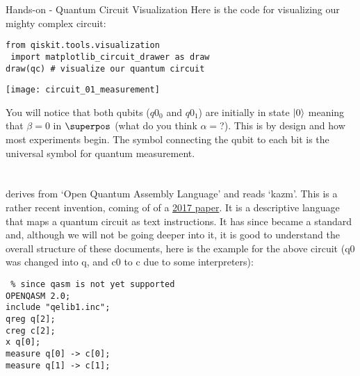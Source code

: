 \documentclass[aspectratio=43]{beamer}
\begin{document}
\begin{frame}[fragile]{Hands-on - Quantum Circuit Visualization}
Here is the code for visualizing our mighty complex circuit:
\begin{cardTiny}
\begin{verbatim}
from qiskit.tools.visualization 
 import matplotlib_circuit_drawer as draw
draw(qc) # visualize our quantum circuit
\end{verbatim}
\end{cardTiny}
\begin{center}
    \texttt{[image: circuit\_01\_measurement]}
\end{center}
\small{
    You will notice that both qubits ($q0_0$ and $q0_1$) are initially in state $\ket{0}$ meaning that $\beta=0$ in $\superpos$ (what do you think $\alpha=$?). This is by design and how most experiments begin. The symbol connecting the qubit to each bit is the universal symbol for quantum measurement.
}
\end{frame}

\section{\qasm}
\begin{frame}[fragile]{\qasm}
    \begin{cardTiny}
    \small{
    \qasm derives from `Open Quantum Assembly Language' and reads `kazm'. This is a rather recent invention, coming of of a \href{https://arxiv.org/abs/1707.03429}{2017 paper}. It is a descriptive language that maps a quantum circuit as text instructions. It has since became a standard and, although we will not be going deeper into it, it is good to understand the overall structure of these documents, here is the example for the above circuit (q0 was changed into q, and c0 to c due to some \qasm interpreters):
    }
    \end{cardTiny}
    \begin{cardTiny}
    \begin{verbatim} % since qasm is not yet supported
OPENQASM 2.0;
include "qelib1.inc";
qreg q[2];
creg c[2];
x q[0];
measure q[0] -> c[0];
measure q[1] -> c[1];
    \end{verbatim}
    \end{cardTiny}
\end{frame}
\end{document}
